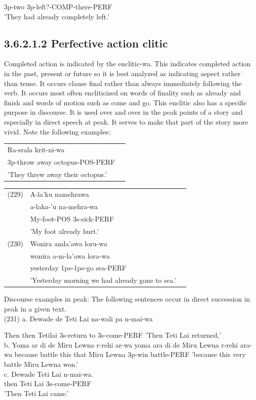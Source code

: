 \documentclass[10pt]{article}
\begin{document}
3p-two 3p-left?-COMP-there-PERF\\
'They had already completely left.'

\subsection*{3.6.2.1.2 Perfective action clitic}
Completed action is indicated by the enclitic-wa. This indicates completed action in the past, present or future so it is best analyzed as indicating aspect rather than tense. It occurs clause final rather than always immediately following the verb. It occurs most often encliticized on words of finality such as already and finish and words of motion such as come and go. This enclitic also has a specific purpose in discourse. It is used over and over in the peak points of a story and especially in direct speech at peak. It serves to make that part of the story more vivid. Note the following examples:

\begin{center}
\begin{tabular}{lc}
Ra-srala krit-ni-wa &  \\
3p-throw away octopus-POS-PERF &  \\
'They threw away their octopus.' &  \\
\end{tabular}
\end{center}

\begin{center}
\begin{tabular}{lll}
(229) & A-la'ku namehrawa \\
 & a-laka-'u na-mehra-wa \\
 & My-foot-POS 3s-sick-PERF \\
 & 'My foot already hurt.' \\
(230) & Wonira amla'awa loru-wa \\
 & wonira a-m-la'awa lora-wa \\
 & yesterday 1pe-1pe-go sea-PERF \\
 & 'Yesterday morning we had already gone to sea.' \\
\end{tabular}
\end{center}

Discourse examples in peak: The following sentences occur in direct succession in peak in a given text.\\
(231) a. Dewade de Teti Lai na-wali pa n-mai-wa

Then then Tetilai 3s-return to 3s-come-PERF 'Then Teti Lai returned,'\\
b. Yoma ar di de Miru Lewna r-rehi ar-wa yoma ara di de Miru Lewna r-rehi ara-wa because battle this that Miru Lewna 3p-win battle-PERF 'because this very battle Miru Lewna won.'\\
c. Dewade Teti Lai n-mai-wa.\\
then Teti Lai 3s-come-PERF\\
'Then Teti Lai came.'
\end{document}
